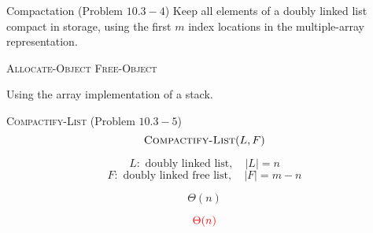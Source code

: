 
\begin{frame}{}
  \begin{exampleblock}{Compactation (Problem $10.3-4$)}
    Keep all elements of a doubly linked list compact in storage,
    using the first $m$ index locations in the multiple-array representation.

    \centerline{\textsc{Allocate-Object} \quad \textsc{Free-Object}}
  \end{exampleblock}

  \pause
  \vspace{0.50cm}
  \centerline{Using the array implementation of a stack.}
\end{frame}

\begin{frame}{}
  \begin{exampleblock}{\textsc{Compactify-List} (Problem $10.3-5$)}
    \[
      \textsc{Compactify-List}(L, F)
    \]

    \[
      L: \text{ doubly linked list},\quad |L| = n
    \]
    \[
      F: \text{ doubly linked free list},\quad |F| = m - n
    \]

    \[
      \Theta(n)
    \]
  \end{exampleblock}

\end{frame}

\begin{frame}{}

  \pause
  \centerline{}

  \pause
  \[
    \textcolor{red}{\Theta(n)}
  \]
\end{frame}

\begin{frame}{}
  \centerline{}
  \vspace{0.60cm}
\end{frame}
